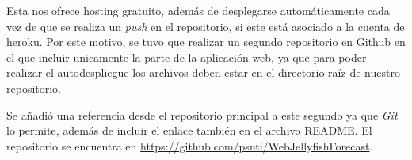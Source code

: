 Esta nos ofrece hosting gratuito, además de desplegarse automáticamente cada vez de que se realiza un \emph{push} en el repositorio, si este está asociado a la cuenta de heroku. Por este motivo, se tuvo que realizar un segundo repositorio en Github en el que incluir unicamente la parte de la aplicación web, ya que para poder realizar el autodespliegue los archivos deben estar en el directorio raíz de nuestro repositorio.

Se añadió una referencia desde el repositorio principal a este segundo ya que \emph{Git} lo permite, además de incluir el enlace también en el archivo README. El repositorio se encuentra en \href{https://github.com/psnti/WebJellyfishForecast}{https://github.com/psnti/WebJellyfishForecast}.


